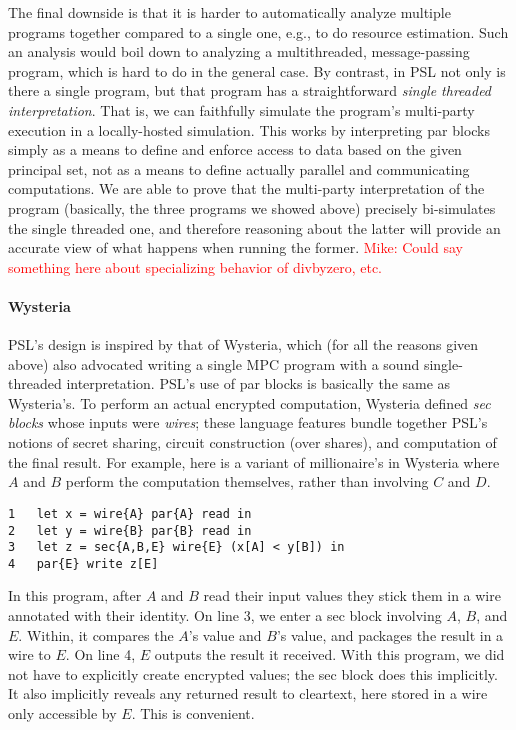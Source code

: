 \documentclass[10pt]{article}
\newcommand{\mwh}[1]{\textcolor{red}{Mike: #1}}
\begin{document}
The final downside is that it is harder to automatically analyze
multiple programs together compared to a single one, e.g.,
to do resource estimation. Such an analysis would boil down to
analyzing a multithreaded, message-passing program, which is hard to
do in the general case. By contrast, in PSL not only is there a single
program, but that program has a straightforward \emph{single threaded
  interpretation}. That is, we can faithfully simulate the program's
multi-party execution in a locally-hosted simulation. This works by
interpreting par blocks simply as a means to define and enforce access
to data based on the given principal set, not as a means to define
actually parallel and communicating computations. We are able to prove
that the multi-party interpretation of the program (basically, the
three programs we showed above) precisely bi-simulates the single
threaded one, and therefore reasoning about the latter will provide an
accurate view of what happens when running the former. \mwh{Could say
  something here about specializing behavior of divbyzero, etc.}

\paragraph{Wysteria}

PSL's design is inspired by that of Wysteria, which (for all the
reasons given above) also advocated
writing a single MPC program with a sound single-threaded
interpretation. PSL's use of par blocks is basically the same as
Wysteria's. To perform an actual encrypted computation, Wysteria
defined \emph{sec blocks} whose inputs were \emph{wires}; these
language features bundle together PSL's notions of secret sharing,
circuit construction (over shares), and computation of the final
result. For example, here is a variant of millionaire's in Wysteria
where $A$ and $B$ perform the computation themselves, rather than
involving $C$ and $D$.
\begin{verbatim}
1   let x = wire{A} par{A} read in
2   let y = wire{B} par{B} read in
3   let z = sec{A,B,E} wire{E} (x[A] < y[B]) in
4   par{E} write z[E]
\end{verbatim}
In this program, after $A$ and $B$ read their input values they stick
them in a wire annotated with their identity. On line 3, we enter a
sec block involving $A$, $B$, and $E$. Within, it compares the $A$'s
value and $B$'s value, and packages the result in a wire to $E$.
On line 4, $E$ outputs the result it received.  With
this program, we did not have to explicitly create encrypted values;
the sec block does this implicitly. It also implicitly reveals any
returned result to cleartext, here stored in a wire only accessible by
$E$. This is convenient.
\end{document}
